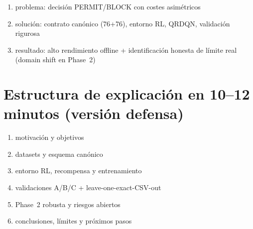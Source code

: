 ﻿\documentclass[12pt,a4paper]{article}
\begin{document}
\begin{enumerate}
  \item problema: decisión PERMIT/BLOCK con costes asimétricos
  \item solución: contrato canónico (76+76), entorno RL, QRDQN, validación rigurosa
  \item resultado: alto rendimiento offline + identificación honesta de límite real (domain shift en
        Phase~2)
\end{enumerate}

\section{Estructura de explicación en 10--12 minutos (versión defensa)}

\begin{enumerate}
  \item motivación y objetivos
  \item datasets y esquema canónico
  \item entorno RL, recompensa y entrenamiento
  \item validaciones A/B/C + leave-one-exact-CSV-out
  \item Phase~2 robusta y riesgos abiertos
  \item conclusiones, límites y próximos pasos
\end{enumerate}
\end{document}
